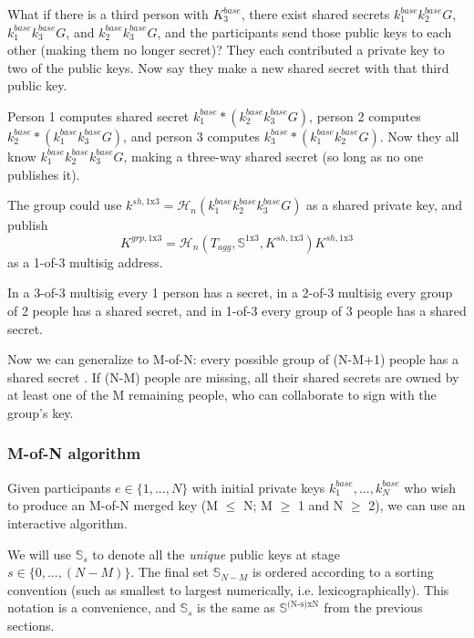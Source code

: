 What if there is a third person with $K^{base}_3$, there exist shared secrets $k^{base}_1 k^{base}_2 G$, $k^{base}_1 k^{base}_3 G$, and $k^{base}_2 k^{base}_3 G$, and the participants send those public keys to each other (making them no longer secret)? They each contributed a private key to two of the public keys. Now say they make a new shared secret with that third public key.

Person 1 computes shared secret $k^{base}_1*(k^{base}_2 k^{base}_3 G)$, person 2 computes $k^{base}_2*(k^{base}_1 k^{base}_3 G)$, and person 3 computes $k^{base}_3*(k^{base}_1 k^{base}_2 G)$. Now they all know $k^{base}_1 k^{base}_2 k^{base}_3 G$, making a three-way shared secret (so long as no one publishes it).

The group could use $k^{sh,\textrm{1x3}} = \mathcal{H}_n(k^{base}_1 k^{base}_2 k^{base}_3 G)$ as a shared private key, and publish\vspace{.155cm} \[K^{grp,\textrm{1x3}} = \mathcal{H}_n(T_{agg},\mathbb{S}^{\textrm{1x3}},K^{sh,\textrm{1x3}}) K^{sh,\textrm{1x3}}\] as a 1-of-3 multisig address.

In a 3-of-3 multisig every 1 person has a secret, in a 2-of-3 multisig every group of 2 people has a shared secret, and in 1-of-3 every group of 3 people has a shared secret. 

Now we can generalize to M-of-N: every possible group of (N-M+1) people has a shared secret \cite{old-multisig-mrl-note}. If (N-M) people are missing, all their shared secrets are owned by at least one of the M remaining people, who can collaborate to sign with the group's key.

\subsubsection*{M-of-N algorithm}

Given participants $e \in \{1,...,N\}$ with initial private keys $k^{base}_1,...,k^{base}_N$ who wish to produce an M-of-N merged key (M $\leq$ N; M $\geq$ 1 and N $\geq$ 2), we can use an interactive algorithm. 

We will use $\mathbb{S}_s$ to denote all the {\em unique} public keys at stage $s \in \{0,...,(N-M)\}$. The final set $\mathbb{S}_{N-M}$ is ordered according to a sorting convention (such as smallest to largest numerically, i.e. lexicographically). This notation is a convenience, and $\mathbb{S}_s$ is the same as $\mathbb{S}^{\textrm{(N-s)xN}}$ from the previous sections.


